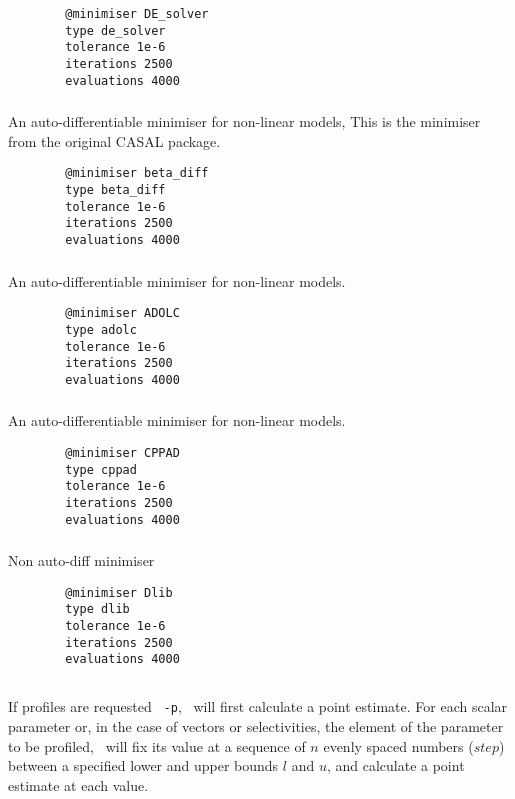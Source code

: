 {\small{\begin{verbatim}
		@minimiser DE_solver
		type de_solver
		tolerance 1e-6
		iterations 2500
		evaluations 4000
		\end{verbatim}}}

\subsubsection{}
An auto-differentiable minimiser for non-linear models, This is the minimiser from the original CASAL package.
{\small{\begin{verbatim}
		@minimiser beta_diff
		type beta_diff
		tolerance 1e-6
		iterations 2500
		evaluations 4000
		\end{verbatim}}}
\subsubsection{}
An auto-differentiable minimiser for non-linear models.
{\small{\begin{verbatim}
		@minimiser ADOLC
		type adolc
		tolerance 1e-6
		iterations 2500
		evaluations 4000
		\end{verbatim}}}
\subsubsection{}
An auto-differentiable minimiser for non-linear models.
{\small{\begin{verbatim}
		@minimiser CPPAD
		type cppad
		tolerance 1e-6
		iterations 2500
		evaluations 4000
		\end{verbatim}}}

\subsubsection{}
Non auto-diff minimiser
{\small{\begin{verbatim}
		@minimiser Dlib
		type dlib
		tolerance 1e-6
		iterations 2500
		evaluations 4000
		\end{verbatim}}}

\subsection{\label{sec:estimate-profiles}}
If profiles are requested \texttt{\cname\ -p}, \CNAME\ will first calculate a point estimate. For each scalar parameter or, in the case of vectors or selectivities, the element of the parameter to be profiled, \CNAME\ will fix its value at a sequence of $n$ evenly spaced numbers ($step$) between a specified lower and upper bounds $l$ and $u$, and calculate a point estimate at each value. 

